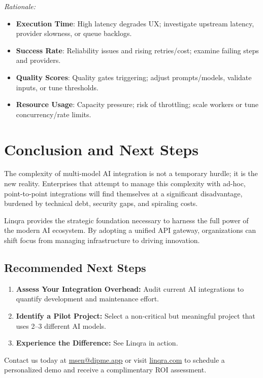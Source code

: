 \documentclass[11pt,a4paper]{article}
\begin{document}
\small
\noindent\textit{Rationale:}
\begin{itemize}[leftmargin=*]
  \item \textbf{Execution Time}: High latency degrades UX; investigate upstream latency, provider slowness, or queue backlogs.
  \item \textbf{Success Rate}: Reliability issues and rising retries/cost; examine failing steps and providers.
  \item \textbf{Quality Scores}: Quality gates triggering; adjust prompts/models, validate inputs, or tune thresholds.
  \item \textbf{Resource Usage}: Capacity pressure; risk of throttling; scale workers or tune concurrency/rate limits.
\end{itemize}
\normalsize

\newpage
\section{Conclusion and Next Steps}
The complexity of multi-model AI integration is not a temporary hurdle; it is the new reality. Enterprises that attempt to manage this complexity with ad-hoc, point-to-point integrations will find themselves at a significant disadvantage, burdened by technical debt, security gaps, and spiraling costs.

Linqra provides the strategic foundation necessary to harness the full power of the modern AI ecosystem. By adopting a unified API gateway, organizations can shift focus from managing infrastructure to driving innovation.

\subsection*{Recommended Next Steps}
\begin{enumerate}[leftmargin=*]
  \item \textbf{Assess Your Integration Overhead:} Audit current AI integrations to quantify development and maintenance effort.
  \item \textbf{Identify a Pilot Project:} Select a non-critical but meaningful project that uses 2--3 different AI models.
  \item \textbf{Experience the Difference:} See Linqra in action.
\end{enumerate}

Contact us today at \href{mailto:msen@dipme.app}{msen@dipme.app} or visit \href{https://linqra.com}{linqra.com} to schedule a personalized demo and receive a complimentary ROI assessment.
\end{document}
